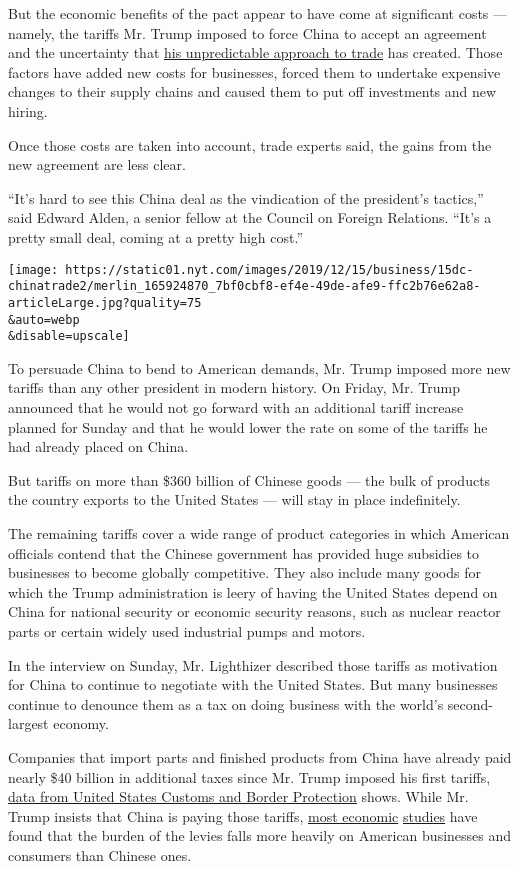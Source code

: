 But the economic benefits of the pact appear to have come at significant
costs --- namely, the tariffs Mr. Trump imposed to force China to accept
an agreement and the uncertainty that
\href{https://www.nytimes.com/2019/11/18/business/trump-trade-war-china.html}{his
unpredictable approach to trade} has created. Those factors have added
new costs for businesses, forced them to undertake expensive changes to
their supply chains and caused them to put off investments and new
hiring.

Once those costs are taken into account, trade experts said, the gains
from the new agreement are less clear.

``It's hard to see this China deal as the vindication of the president's
tactics,'' said Edward Alden, a senior fellow at the Council on Foreign
Relations. ``It's a pretty small deal, coming at a pretty high cost.''

\texttt{[image: https://static01.nyt.com/images/2019/12/15/business/15dc-chinatrade2/merlin\_165924870\_7bf0cbf8-ef4e-49de-afe9-ffc2b76e62a8-articleLarge.jpg?quality=75\\\&auto=webp\\\&disable=upscale]}

To persuade China to bend to American demands, Mr. Trump imposed more
new tariffs than any other president in modern history. On Friday, Mr.
Trump announced that he would not go forward with an additional tariff
increase planned for Sunday and that he would lower the rate on some of
the tariffs he had already placed on China.

But tariffs on more than \$360 billion of Chinese goods --- the bulk of
products the country exports to the United States --- will stay in place
indefinitely.

The remaining tariffs cover a wide range of product categories in which
American officials contend that the Chinese government has provided huge
subsidies to businesses to become globally competitive. They also
include many goods for which the Trump administration is leery of having
the United States depend on China for national security or economic
security reasons, such as nuclear reactor parts or certain widely used
industrial pumps and motors.

In the interview on Sunday, Mr. Lighthizer described those tariffs as
motivation for China to continue to negotiate with the United States.
But many businesses continue to denounce them as a tax on doing business
with the world's second-largest economy.

Companies that import parts and finished products from China have
already paid nearly \$40 billion in additional taxes since Mr. Trump
imposed his first tariffs,
\href{https://www.cbp.gov/newsroom/stats/trade}{data from United States
Customs and Border Protection} shows. While Mr. Trump insists that China
is paying those tariffs,
\href{https://www.nytimes.com/2019/06/03/business/tariffs-trump-mexico-china.html}{most
economic}
\href{https://bfi.uchicago.edu/working-paper/tariff-passthrough-at-the-border-and-at-the-store-evidence-from-us-trade-policy/}{studies}
have found that the burden of the levies falls more heavily on American
businesses and consumers than Chinese ones.


